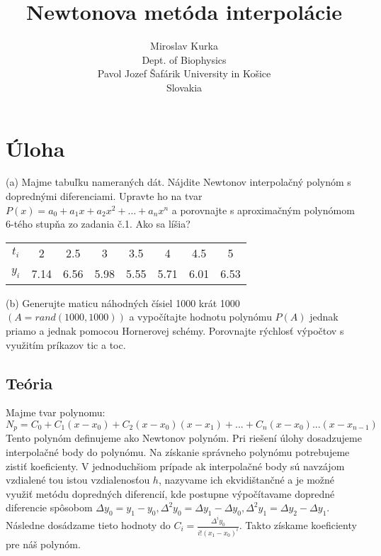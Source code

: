 \documentclass{article}
\title{Newtonova metóda interpolácie}
\author{Miroslav Kurka\\
  \small Dept. of Biophysics\\
  \small Pavol Jozef Šafárik University in Košice\\
  \small Slovakia 
}
\theoremstyle{definition}
\theoremstyle{remark}
\begin{document}
\maketitle


\section{Úloha}

(a) Majme tabuľku nameraných dát. Nájdite Newtonov interpolačný polynóm
s doprednými diferenciami. Upravte ho na tvar $P(x)=a_0+a_1x+a_2x^2+...+a_nx^n$ 
a porovnajte s aproximačným polynómom 6-tého stupňa zo zadania č.1. Ako sa líšia?
\begin{center}
\begin{tabular}{ |c|c|c|c|c|c|c|c|} 
 \hline
 $t_i$ & 2 & 2.5 & 3 & 3.5 & 4 & 4.5 & 5 \\
 $y_i$ & 7.14 & 6.56 & 5.98 & 5.55 & 5.71 & 6.01 & 6.53 \\
 \hline
\end{tabular}
\end{center}

(b) Generujte maticu náhodných čísiel 1000 krát 1000 $(A=rand(1000,1000))$
a vypočítajte hodnotu polynómu $P(A)$ jednak priamo a jednak pomocou Hornerovej
schémy. Porovnajte rýchlosť výpočtov s využitím príkazov tic a toc.
\subsection{Teória}\label{sec:nothing}
Majme tvar polynomu: $$N_p=C_0+C_1(x-x_0)+C_2(x-x_0)(x-x_1)+...+C_n(x-x_0)...(x-x_{n-1})$$ 
Tento polynóm definujeme ako Newtonov
polynóm. Pri riešení úlohy dosadzujeme interpolačné body do polynómu. Na získanie správneho polynómu potrebujeme zistiť koeficienty.
V jednoduchšiom prípade ak interpolačné body sú navzájom vzdialené tou istou vzdialenosťou $h$, nazyvame ich ekvidištančné a je možné využiť metódu dopredných diferencií, kde postupne výpočítavame dopredné diferencie spôsobom $\Delta y_0=y_1-y_0, \Delta^2y_0=\Delta y_1 - \Delta y_0, \Delta^2y_1=\Delta y_2 - \Delta y_1$. Následne dosádzame tieto hodnoty do $C_i=\frac{\Delta^iy_0}{i!(x_1-x_0)^i}$. Takto získame koeficienty pre náš polynóm.\cite{Bsp}
\end{document}
